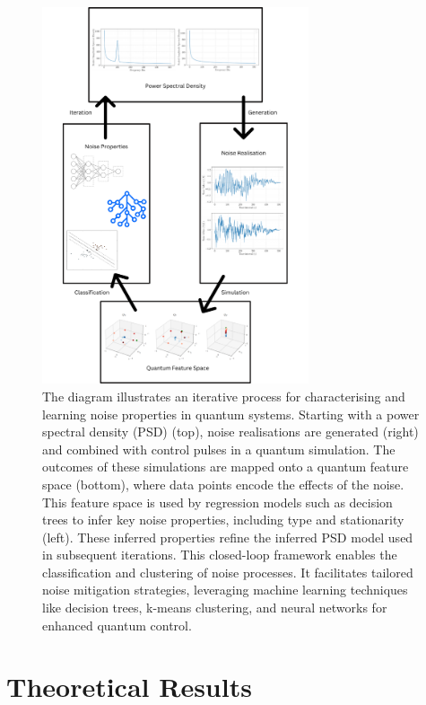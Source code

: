 \documentclass[12pt]{iopart}
\begin{document}
\begin{figure}
    \centering
    \includegraphics[width=0.7\textwidth]{figures/schematic.pdf}
    \caption{The diagram illustrates an iterative process for characterising and learning noise properties in quantum systems. Starting with a power spectral density (PSD) (top), noise realisations are generated (right) and combined with control pulses in a quantum simulation. The outcomes of these simulations are mapped onto a quantum feature space (bottom), where data points encode the effects of the noise. This feature space is used by regression models such as decision trees to infer key noise properties, including type and stationarity (left). These inferred properties refine the inferred PSD model used in subsequent iterations. This closed-loop framework enables the classification and clustering of noise processes. It facilitates tailored noise mitigation strategies, leveraging machine learning techniques like decision trees, k-means clustering, and neural networks for enhanced quantum control.}
    \label{fig:schematic}
\end{figure}

\section{Theoretical Results \label{sec:noise_operator_formalism}}
\end{document}

